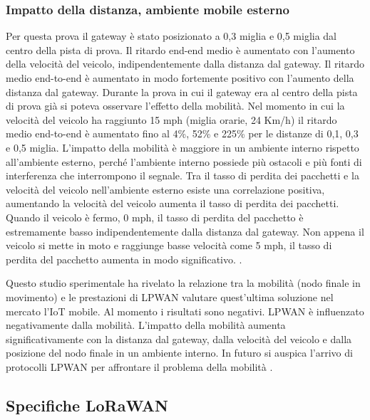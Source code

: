 \documentclass[a4paper]{report} %
\begin{document}
\subsubsection{Impatto della distanza, ambiente mobile esterno}
Per questa prova il gateway è stato posizionato a 0,3 miglia e 0,5 miglia dal centro della pista di prova. Il ritardo end-end medio è aumentato con l'aumento della velocità del veicolo, indipendentemente dalla distanza dal gateway. Il ritardo medio end-to-end è aumentato in modo fortemente positivo con l'aumento della distanza dal gateway. Durante la prova in cui il gateway era al centro della pista di prova già si poteva osservare l'effetto della mobilità. Nel momento in cui la velocità del veicolo ha raggiunto 15 mph (miglia orarie, 24 Km/h) il ritardo medio end-to-end è aumentato fino al 4\%, 52\% e 225\% per le distanze di 0,1, 0,3 e 0,5 miglia. L'impatto della mobilità è maggiore in un ambiente interno rispetto all'ambiente esterno, perché l'ambiente interno possiede più ostacoli e più fonti di interferenza che interrompono il segnale. Tra il tasso di perdita dei pacchetti e la velocità del veicolo nell'ambiente esterno esiste una correlazione positiva, aumentando la velocità del veicolo aumenta il tasso di perdita dei pacchetti. Quando il veicolo è fermo, 0 mph, il tasso di perdita del pacchetto è estremamente basso indipendentemente dalla distanza dal gateway. Non appena il veicolo si mette in moto e raggiunge basse velocità come 5 mph, il tasso di perdita del pacchetto aumenta in modo significativo. \cite{art:rif.47}.

Questo studio sperimentale ha rivelato la relazione tra la mobilità (nodo finale in movimento) e le prestazioni di LPWAN valutare quest'ultima soluzione nel mercato l'IoT mobile. Al momento i risultati sono negativi. LPWAN è influenzato negativamente dalla mobilità. L'impatto della mobilità aumenta significativamente con la distanza dal gateway, dalla velocità del veicolo e dalla posizione del nodo finale in un ambiente interno. In futuro si auspica l'arrivo di protocolli LPWAN per affrontare il problema della mobilità \cite{art:rif.47}.
\subsection{Specifiche LoRaWAN}
\end{document}
